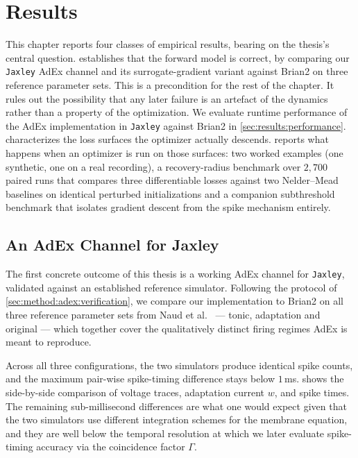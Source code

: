\section{Results}\label{ch:results}




This chapter reports four classes of empirical results, bearing on the thesis's central question.
 establishes that the forward model is correct, by comparing our \texttt{Jaxley} \gls{AdEx} channel and its surrogate-gradient variant against Brian2 on three reference parameter sets.
This is a precondition for the rest of the chapter.
It rules out the possibility that any later failure is an artefact of the dynamics rather than a property of the optimization.
We evaluate runtime performance of the \gls{AdEx} implementation in \texttt{Jaxley} against Brian2 in \cref{sec:results:performance}.
 characterizes the loss surfaces the optimizer actually descends.
 reports what happens when an optimizer is run on those surfaces:
two worked examples (one synthetic, one on a real recording),
a recovery-radius benchmark over $2{,}700$ paired runs that compares three differentiable losses against two Nelder--Mead baselines on identical perturbed initializations
and a companion subthreshold benchmark that isolates gradient descent from the spike mechanism entirely.

\subsection{An AdEx Channel for Jaxley}\label{sec:results:verification}

The first concrete outcome of this thesis is a working \gls{AdEx} channel for \texttt{Jaxley}, validated against an established reference simulator.
Following the protocol of \cref{sec:method:adex:verification}, we compare our implementation to Brian2 \cite{Stimberg2019} on all three reference parameter sets from Naud et al.~\cite{Naud2008} --- tonic, adaptation and original --- which together cover the qualitatively distinct firing regimes \gls{AdEx} is meant to reproduce.

Across all three configurations, the two simulators produce identical spike counts, and the maximum pair-wise spike-timing difference stays below $1$\,ms.
 shows the side-by-side comparison of voltage traces, adaptation current $w$, and spike times.
The remaining sub-millisecond differences are what one would expect given that the two simulators use different integration schemes for the membrane equation, and they are well below the temporal resolution at which we later evaluate spike-timing accuracy via the coincidence factor $\Gamma$.

